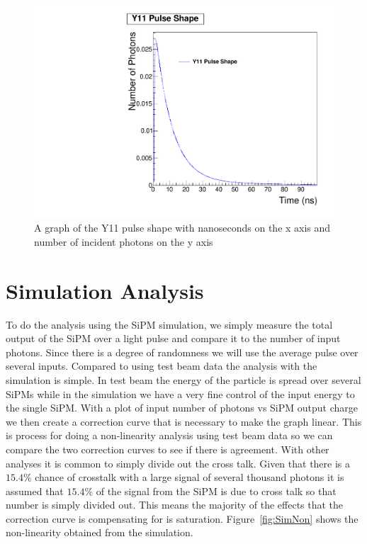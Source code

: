 \begin{figure}
\centering
\includegraphics[width=0.8\linewidth]{Figures/Y11.pdf}
\caption{A graph of the Y11 pulse shape with nanoseconds on the x axis and number of incident photons on the y axis}
\label{fig:Y11}
\end{figure}

\section{Simulation Analysis}

To do the analysis using the SiPM simulation, we simply measure the total output of the SiPM over a light pulse and compare it to the number of input photons. Since there is a degree of randomness we will use the average pulse over several inputs. Compared to using test beam data the analysis with the simulation is simple. In test beam the energy of the particle is spread over several SiPMs while in the simulation we have a very fine control of the input energy to the single SiPM. With a plot of input number of photons vs SiPM output charge we then create a correction curve that is necessary to make the graph linear. This is process for doing a non-linearity analysis using test beam data so we can compare the two correction curves to see if there is agreement. With other analyses it is common to simply divide out the cross talk. Given that there is a $15.4\%$ chance of crosstalk with a large signal of several thousand photons it is assumed that $15.4\%$ of the signal from the SiPM is due to cross talk so that number is simply divided out. This means the majority of the effects that the correction curve is compensating for is saturation. Figure~\ref{fig:SimNon} shows the non-linearity obtained from the simulation.

